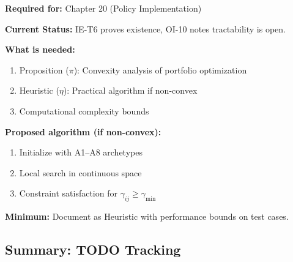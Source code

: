 \begin{tcolorbox}[colback=blue!5!white, colframe=blue!75!black,
    title=\textbf{TODO-IE-10: Portfolio Optimization Algorithm}]

\textbf{Required for:} Chapter 20 (Policy Implementation)

\textbf{Current Status:} IE-T6 proves existence, OI-10 notes tractability is open.

\textbf{What is needed:}
\begin{enumerate}[nosep]
    \item Proposition ($\pi$): Convexity analysis of portfolio optimization
    \item Heuristic ($\eta$): Practical algorithm if non-convex
    \item Computational complexity bounds
\end{enumerate}

\textbf{Proposed algorithm (if non-convex):}
\begin{enumerate}[nosep]
    \item Initialize with A1--A8 archetypes
    \item Local search in continuous space
    \item Constraint satisfaction for $\gamma_{ij} \geq \gamma_{\min}$
\end{enumerate}

\textbf{Minimum:} Document as Heuristic with performance bounds on test cases.

\end{tcolorbox}

\subsection{Summary: TODO Tracking}

